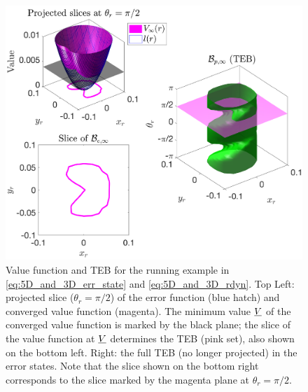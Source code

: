 \begin{figure}
	\includegraphics[width=\columnwidth]{fig/valfunc_illustration}
	\caption{Value function and TEB for the running example in \eqref{eq:5D_and_3D_err_state} and \eqref{eq:5D_and_3D_rdyn}. Top Left: projected slice ($\theta_r = \pi/2$) of the error function (blue hatch) and converged value function (magenta). The minimum value $\underline{V}$ of the converged value function is marked by the black plane; the slice of the value function at $\underline{V}$ determines the TEB (pink set), also shown on the bottom left.
		Right: the full TEB (no longer projected) in the error states. Note that the slice shown on the bottom right corresponds to the slice marked by the magenta plane at $\theta_r = \pi/2$.}
	\label{fig:valfunc_illustration}  
\end{figure}

